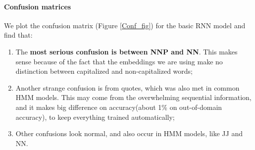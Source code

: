 \documentclass[11pt]{article}
\begin{document}
\paragraph{Confusion matrices}
We plot the confusion matrix (Figure \ref{Conf_fig}) for the basic RNN model and find that:
\begin{enumerate}
\item The \textbf{most serious confusion is between NNP and NN}. This makes sense because of the fact that the embeddings we are using make no distinction between capitalized and non-capitalized words;
\item  Another strange confusion is from quotes, which was also met in common HMM models. This may come from the overwhelming sequential information, and it makes big difference on accuracy(about 1\% on out-of-domain accuracy), to keep everything trained automatically;
\item Other confusions look normal, and also occur in HMM models, like JJ and NN.
\end{enumerate}
\end{document}
